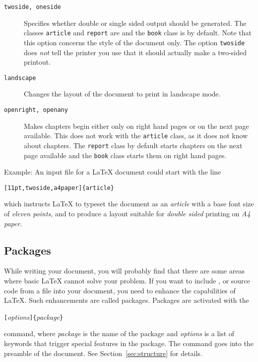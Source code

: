 \begin{table}[!bp]
\begin{lined}{\textwidth}
\begin{FlushLeft}
\begin{description}
        \item[\normalfont\texttt{twoside, oneside}] \quad Specifies whether double or
          single sided output should be generated. The classes
          \texttt{article} and \texttt{report} are  and the
          \texttt{book} class is  by default. Note that this
          option concerns the style of the document only. The option
          \texttt{twoside} does \emph{not} tell the printer you use that it
          should actually make a two-sided printout.
        \item[\normalfont\texttt{landscape}] \quad Changes the layout of the document to print in landscape mode.
        \item[\normalfont\texttt{openright, openany}] \quad Makes chapters begin either
          only on right hand pages or on the next page available. This does
          not work with the \texttt{article} class, as it does not know about
          chapters. The \texttt{report} class by default starts chapters on
          the next page available and the \texttt{book} class starts them on
          right hand pages.

      \end{description}
    \end{FlushLeft}
  \end{lined}
\end{table}

Example: An input file for a \LaTeX{} document could start with the
line
\begin{code}
\verb|[11pt,twoside,a4paper]{article}|
\end{code}
which instructs \LaTeX{} to typeset the document as an \emph{article}
with a base font size of \emph{eleven points}, and to produce a
layout suitable for \emph{double sided} printing on \emph{A4 paper}.
\pagebreak[2]

\subsection{Packages}
While writing your document, you will probably find
that there are some areas where basic \LaTeX{} cannot solve your
problem. If you want to include ,  or
source code from a file into your document, you need to enhance the
capabilities of \LaTeX.  Such enhancements are called packages.
Packages are activated with the
\begin{lscommand}
  \verb|[|\emph{options}\verb|]{|\emph{package}\verb|}|
\end{lscommand}
\noindent command, where \emph{package} is the name of the package and
\emph{options} is a list of keywords that trigger special features in
the package. The  command goes into the preamble of the
document. See Section~\ref{sec:structure} for details.

